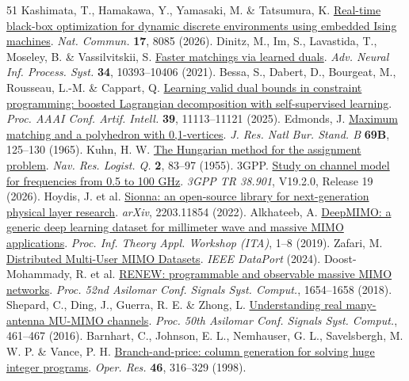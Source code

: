 \documentclass[lineno,pdflatex,sn-nature]{sn-jnl}
\begin{document}
\begin{thebibliography}{51}
 Kashimata, T., Hamakawa, Y., Yamasaki, M. \& Tatsumura, K. \href{https://doi.org/10.1038/s41467-026-76069-3}{Real-time black-box optimization for dynamic discrete environments using embedded Ising machines}. \emph{Nat. Commun.} \textbf{17}, 8085 (2026).
 Dinitz, M., Im, S., Lavastida, T., Moseley, B. \& Vassilvitskii, S. \href{https://proceedings.neurips.cc/paper/2021/hash/5616060fb8ae85d93f334e7267307664-Abstract.html}{Faster matchings via learned duals}. \emph{Adv. Neural Inf. Process. Syst.} \textbf{34}, 10393–10406 (2021).
 Bessa, S., Dabert, D., Bourgeat, M., Rousseau, L.-M. \& Cappart, Q. \href{https://doi.org/10.1609/aaai.v39i11.33208}{Learning valid dual bounds in constraint programming: boosted Lagrangian decomposition with self-supervised learning}. \emph{Proc. AAAI Conf. Artif. Intell.} \textbf{39}, 11113–11121 (2025).
 Edmonds, J. \href{https://doi.org/10.6028/jres.069B.013}{Maximum matching and a polyhedron with 0,1-vertices}. \emph{J. Res. Natl Bur. Stand. B} \textbf{69B}, 125–130 (1965).
 Kuhn, H. W. \href{https://doi.org/10.1002/nav.3800020109}{The Hungarian method for the assignment problem}. \emph{Nav. Res. Logist. Q.} \textbf{2}, 83–97 (1955).
 3GPP. \href{https://www.etsi.org/deliver/etsi_tr/138900_138999/138901/19.02.00_60/tr_138901v190200p.pdf}{Study on channel model for frequencies from 0.5 to 100 GHz}. \emph{3GPP TR 38.901}, V19.2.0, Release 19 (2026).
 Hoydis, J. et al. \href{https://doi.org/10.48550/arXiv.2203.11854}{Sionna: an open-source library for next-generation physical layer research}. \emph{arXiv}, 2203.11854 (2022).
 Alkhateeb, A. \href{https://arxiv.org/abs/1902.06435}{DeepMIMO: a generic deep learning dataset for millimeter wave and massive MIMO applications}. \emph{Proc. Inf. Theory Appl. Workshop (ITA)}, 1–8 (2019).
 Zafari, M. \href{https://doi.org/10.21227/74ez-b275}{Distributed Multi-User MIMO Datasets}. \emph{IEEE DataPort} (2024).
 Doost-Mohammady, R. et al. \href{https://doi.org/10.1109/ACSSC.2018.8645391}{RENEW: programmable and observable massive MIMO networks}. \emph{Proc. 52nd Asilomar Conf. Signals Syst. Comput.}, 1654–1658 (2018).
 Shepard, C., Ding, J., Guerra, R. E. \& Zhong, L. \href{https://doi.org/10.1109/ACSSC.2016.7869082}{Understanding real many-antenna MU-MIMO channels}. \emph{Proc. 50th Asilomar Conf. Signals Syst. Comput.}, 461–467 (2016).
 Barnhart, C., Johnson, E. L., Nemhauser, G. L., Savelsbergh, M. W. P. \& Vance, P. H. \href{https://doi.org/10.1287/opre.46.3.316}{Branch-and-price: column generation for solving huge integer programs}. \emph{Oper. Res.} \textbf{46}, 316–329 (1998).

\end{thebibliography}
\end{document}
